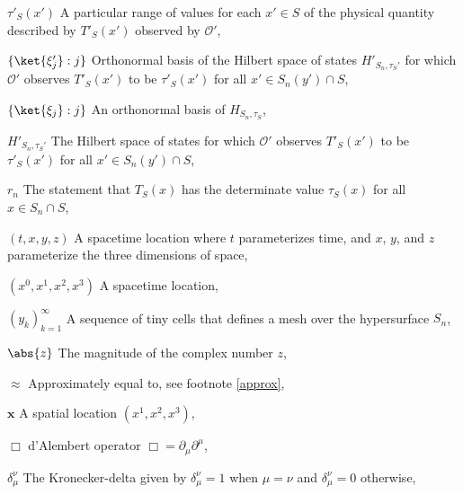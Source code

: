 
\begin{thenomenclature} 
      \item [{ $\tau'_S(x')$}]\begingroup A particular range of values for each $x'\in S$ of the physical quantity described by $T'_S(x')$ observed by $\mathcal{O}'$, \nomrefpage{}
      \item [{ $\{\ket{\xi_j'}:j\}$}]\begingroup Orthonormal basis of the Hilbert space of states $H'_{S_n,\tau_S'}$ for which $\mathcal{O}'$ observes $T'_S(x')$ to be $\tau'_S(x')$ for all $x'\in S_n(y')\cap S$, \nomrefpage{}
      \item [{ $\{\ket{\xi_j}:j\}$}]\begingroup An orthonormal basis of $H_{S_n,\tau_S}$, \nomrefpage{}
      \item [{ $H'_{S_n,\tau_S'}$}]\begingroup The Hilbert space of states for which $\mathcal{O}'$ observes $T'_S(x')$ to be $\tau'_S(x')$ for all $x'\in S_n(y')\cap S$, \nomrefpage{}
      \item [{ $r_n$}]\begingroup The statement that  $T_S(x)$ has the determinate value $\tau_S(x)$ for all $x\in S_n\cap S$, \nomrefpage{}
      \item [{$(t, x, y, z)$}]\begingroup A spacetime location where $t$ parameterizes time, and $x$, $y$, and $z$ parameterize the three dimensions of space, \nomrefpage {}
      \item [{$(x^0,x^1,x^2,x^3)$}]\begingroup A spacetime location, \nomrefpage{}
      \item [{$(y_k)_{k=1}^\infty$}]\begingroup A sequence of tiny cells that defines a mesh over the hypersurface $S_n$, \nomrefpage{}
      \item [{$\abs {z}$}]\begingroup The magnitude of the complex number $z$, \nomrefpage {}
      \item [{$\approx$}]\begingroup Approximately equal to, see footnote \ref{approx}, \nomrefpage{}
      \item [{$\bm{x}$}]\begingroup A spatial location $(x^1,x^2,x^3)$, \nomrefpage{}
      \item [{$\Box $}]\begingroup d'Alembert operator $\Box =\partial _\mu \partial ^\mu $, \nomrefpage {}
      \item [{$\delta^\nu_\mu$}]\begingroup The {Kronecker-delta} given by $\delta^\nu_\mu=1$ when $\mu=\nu$ and $\delta^\nu_\mu=0$ otherwise, \nomrefpage{}

\end{thenomenclature}

